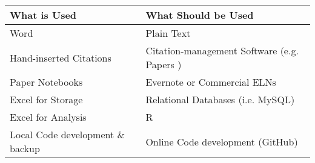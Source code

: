 \footnotesize
\begin{tabular}{p{6cm}|p{8cm}}

\textbf{What is Used}            & \textbf{What Should be Used}                \\ \hline 
Word                             & Plain Text                                  \\ \hline 
Hand-inserted Citations          & Citation-management Software (e.g. Papers ) \\ \hline 
Paper Notebooks                  & Evernote or Commercial ELNs                 \\ \hline 
Excel for Storage                & Relational Databases (i.e. MySQL)           \\ \hline 
Excel for Analysis               & R                                           \\ \hline 
Local Code development \& backup & Online Code development (GitHub)            \\ \hline 
\end{tabular}


